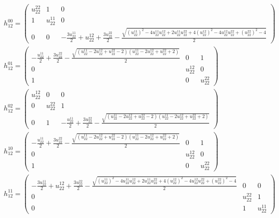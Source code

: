 \documentclass[a4paper, 11pt, twoside, onecolumn]{article}
\begin{document}
\begin{landscape}
\begin{gather*} 
	 h_12^{00}=\begin{pmatrix}u^{22}_{22} & 1 & 0\\1 & u^{11}_{22} & 0\\0 & 0 & - \frac{3 u^{11}_{22}}{2} + u^{12}_{22} + \frac{3 u^{22}_{22}}{2} - \frac{\sqrt{\left(u^{11}_{22}\right)^{2} - 4 u^{11}_{22} u^{12}_{22} + 2 u^{11}_{22} u^{22}_{22} + 4 \left(u^{12}_{22}\right)^{2} - 4 u^{12}_{22} u^{22}_{22} + \left(u^{22}_{22}\right)^{2} - 4}}{2}\end{pmatrix}\\ 
	 h_12^{01}=\begin{pmatrix}- \frac{u^{11}_{22}}{2} + \frac{3 u^{22}_{22}}{2} - \frac{\sqrt{\left(u^{11}_{22} - 2 u^{12}_{22} + u^{22}_{22} - 2\right) \left(u^{11}_{22} - 2 u^{12}_{22} + u^{22}_{22} + 2\right)}}{2} & 0 & 1\\0 & u^{12}_{22} & 0\\1 & 0 & u^{22}_{22}\end{pmatrix}\\ 
	 h_12^{02}=\begin{pmatrix}u^{12}_{22} & 0 & 0\\0 & u^{22}_{22} & 1\\0 & 1 & - \frac{u^{11}_{22}}{2} + \frac{3 u^{22}_{22}}{2} - \frac{\sqrt{\left(u^{11}_{22} - 2 u^{12}_{22} + u^{22}_{22} - 2\right) \left(u^{11}_{22} - 2 u^{12}_{22} + u^{22}_{22} + 2\right)}}{2}\end{pmatrix}\\ 
	 h_12^{10}=\begin{pmatrix}- \frac{u^{11}_{22}}{2} + \frac{3 u^{22}_{22}}{2} - \frac{\sqrt{\left(u^{11}_{22} - 2 u^{12}_{22} + u^{22}_{22} - 2\right) \left(u^{11}_{22} - 2 u^{12}_{22} + u^{22}_{22} + 2\right)}}{2} & 0 & 1\\0 & u^{12}_{22} & 0\\1 & 0 & u^{22}_{22}\end{pmatrix}\\ 
	 h_12^{11}=\begin{pmatrix}- \frac{3 u^{11}_{22}}{2} + u^{12}_{22} + \frac{3 u^{22}_{22}}{2} - \frac{\sqrt{\left(u^{11}_{22}\right)^{2} - 4 u^{11}_{22} u^{12}_{22} + 2 u^{11}_{22} u^{22}_{22} + 4 \left(u^{12}_{22}\right)^{2} - 4 u^{12}_{22} u^{22}_{22} + \left(u^{22}_{22}\right)^{2} - 4}}{2} & 0 & 0\\0 & u^{22}_{22} & 1\\0 & 1 & u^{11}_{22}\end{pmatrix}\\ 

\end{gather*}
\end{landscape}
\end{document}
